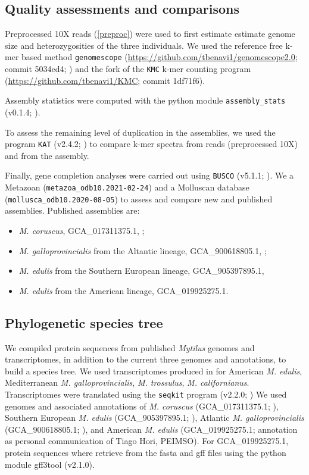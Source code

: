 \documentclass[11pt, a4paper]{article}
\begin{document}
\subsection{Quality assessments and comparisons}

Preprocessed 10X reads (\cref{preproc}) were used to first estimate estimate genome size and heterozygosities of the three individuals.
We used the reference free k-mer based method \texttt{genomescope} (\url{https://github.com/tbenavi1/genomescope2.0}; commit 5034ed4; \cite{Ranallo-Benavidez2020}) and the fork of the \texttt{KMC} k-mer  counting program (\url{https://github.com/tbenavi1/KMC}; commit 1df71f6).

Assembly statistics were computed with the python module \texttt{assembly\_stats} (v0.1.4; \cite{Trizna2020}).

To assess the remaining level of duplication in the assemblies, we used the program \texttt{KAT} (v2.4.2; \cite{Mapleson2017}) to compare k-mer spectra from reads (preprocessed 10X) and from the assembly.

Finally, gene completion analyses were carried out using \texttt{BUSCO} (v5.1.1; \cite{Manni2021}).
We a Metazoan (\texttt{metazoa\_odb10.2021-02-24}) and a Molluscan database (\texttt{mollusca\_odb10.2020-08-05}) to assess and compare new and published assemblies.
Published assemblies are:
\begin{itemize}
	\item \textit{M. coruscus}, GCA\_017311375.1, \textcite{Yang2021};
	\item \textit{M. galloprovincialis} from the Altantic lineage, GCA\_900618805.1, \textcite{Gerdol2020};
	\item \textit{M. edulis} from the Southern European lineage, GCA\_905397895.1, \textcite{Corrochano-Fraile2021}
	\item \textit{M. edulis} from the American lineage, GCA\_019925275.1.
\end{itemize}


\subsection{Phylogenetic species tree}

We compiled protein sequences from published \textit{Mytilus} genomes and transcriptomes,
in addition to the current three genomes and annotations, to build a species tree.
We used transcriptomes produced in \textcite{Popovic2020a} for American \textit{M. edulis}, 
Mediterranean \textit{M. galloprovincialis}, \textit{M. trossulus}, \textit{M. californianus}.
Transcriptomes were translated using the \texttt{seqkit} program (v2.2.0; \cite{Shen2016})
We used genomes and associated annotations of \textit{M. coruscus} (GCA\_017311375.1; \textcite{Yang2021}),
Southern European \textit{M. edulis} (GCA\_905397895.1; \textcite{Corrochano-Fraile2021}),
Atlantic \textit{M. galloprovincialis} (GCA\_900618805.1; \textcite{Gerdol2020}),
and American \textit{M. edulis} (GCA\_019925275.1; annotation as personal communication of Tiago Hori, PEIMSO).
For GCA\_019925275.1, protein sequences where retrieve from the fasta and gff files using the python module gff3tool (v2.1.0).
\end{document}
